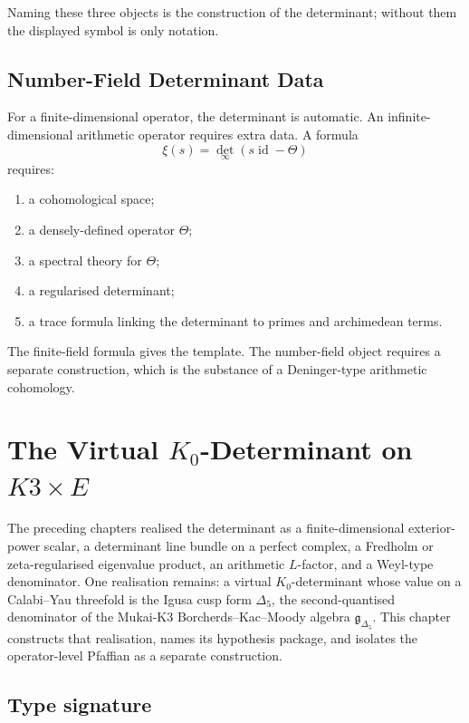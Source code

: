 \documentclass[11pt]{memoir}
\providecommand{\id}{\operatorname{id}}
\providecommand{\fg}{\mathfrak{g}}
\begin{document}
Naming these three objects is the construction of the determinant;
without them the displayed symbol is only notation.

\section{Number-Field Determinant Data}
\label{sec:arithmetic-warning}

For a finite-dimensional operator, the determinant is automatic. An
infinite-dimensional arithmetic operator requires extra data. A formula
\[
  \xi(s)=\det_\infty(s\id-\Theta)
\]
requires:
\begin{enumerate}
\item a cohomological space;
\item a densely-defined operator \(\Theta\);
\item a spectral theory for \(\Theta\);
\item a regularised determinant;
\item a trace formula linking the determinant to primes and
archimedean terms.
\end{enumerate}

The finite-field formula gives the template. The number-field object
requires a separate construction, which is the substance of a
Deninger-type arithmetic cohomology.

\chapter{The Virtual \texorpdfstring{$K_0$}{K0}-Determinant on \texorpdfstring{$K3\times E$}{K3 x E}}
\label{ch:virtual-k0-det}

The preceding chapters realised the determinant as a finite-dimensional
exterior-power scalar, a determinant line bundle on a perfect complex,
a Fredholm or zeta-regularised eigenvalue product, an arithmetic
$L$-factor, and a Weyl-type denominator. One realisation remains: a
virtual $K_0$-determinant whose value on a Calabi--Yau threefold is the
Igusa cusp form $\Delta_5$, the second-quantised denominator of the
Mukai-K3 Borcherds--Kac--Moody algebra $\fg_{\Delta_5}$. This chapter
constructs that realisation, names its hypothesis package, and isolates
the operator-level Pfaffian as a separate construction.

\section{Type signature}
\label{sec:vd-type-signature}
\end{document}
